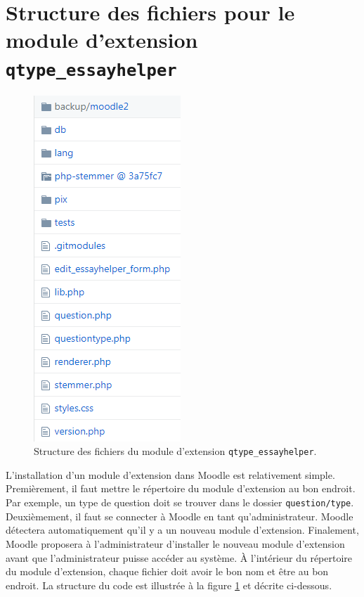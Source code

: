 \section{Structure des fichiers pour le module d'extension \texttt{qtype\_essayhelper}}
\begin{figure}[htbp]
   \begin{center}
  \includegraphics[scale=1]{images/architecture.png}
  \end{center}
  \caption{Structure des fichiers du module d'extension \texttt{qtype\_essayhelper}.}
  \label{dev-architecture}
\end{figure}
L'installation d'un module d'extension dans Moodle est relativement simple.
Premi\`erement, il faut mettre le r\'epertoire du module d'extension au bon endroit.
Par exemple, un type de question doit se trouver dans le dossier \texttt{question/type}.
Deuxi\`emement, il faut se connecter \`a Moodle en tant qu'administrateur.
Moodle d\'etectera automatiquement qu'il y a un nouveau module d'extension.
Finalement, Moodle proposera \`a l'administrateur d'installer le nouveau module d'extension avant que l'administrateur puisse acc\'eder au syst\`eme.
\`A l'int\'erieur du r\'epertoire du module d'extension, chaque fichier doit avoir le bon nom et \^etre au bon endroit.
La structure du code est illustr\'ee \`a la figure \ref{dev-architecture} et d\'ecrite ci-dessous.
 
